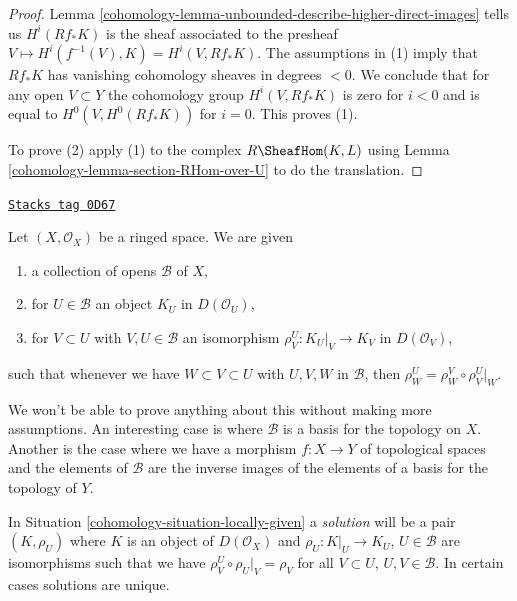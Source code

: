 \begin{proof}

Lemma \ref{cohomology-lemma-unbounded-describe-higher-direct-images} tells us
$H^i(Rf_*K)$ is the sheaf associated to the presheaf
$V \mapsto H^i(f^{-1}(V), K) = H^i(V, Rf_*K)$.
The assumptions in (1) imply that $Rf_*K$ has vanishing cohomology
sheaves in degrees $< 0$. We conclude that for any open $V \subset Y$
the cohomology group $H^i(V, Rf_*K)$ is zero for $i < 0$ and is equal to
$H^0(V, H^0(Rf_*K))$ for $i = 0$. This proves (1).

\medskip\noindent
To prove (2) apply (1) to the complex $R\SheafHom(K, L)$ using
Lemma \ref{cohomology-lemma-section-RHom-over-U} to do the translation.
\end{proof}

\begin{definition}
\label{cohomology-situation-locally-given}
\href{https://stacks.math.columbia.edu/tag/0D67}{\texttt{Stacks tag 0D67}}

Let $(X, \mathcal{O}_X)$ be a ringed space. We are given
\begin{enumerate}
\item a collection of opens $\mathcal{B}$ of $X$,
\item for $U \in \mathcal{B}$ an object $K_U$ in $D(\mathcal{O}_U)$,
\item for $V \subset U$ with $V, U \in \mathcal{B}$ an isomorphism
$\rho^U_V : K_U|_V \to K_V$ in $D(\mathcal{O}_V)$,
\end{enumerate}
such that whenever we have $W \subset V \subset U$ with $U, V, W$ in
$\mathcal{B}$, then $\rho^U_W = \rho^V_W \circ \rho ^U_V|_W$.
\end{definition}

We won't be able to prove anything about this without making more
assumptions. An interesting case is where $\mathcal{B}$ is a basis
for the topology on $X$. Another is the case where we have a morphism
$f : X \to Y$ of topological spaces and the elements of $\mathcal{B}$
are the inverse images of the elements of a basis for the topology of $Y$.

\medskip\noindent
In Situation \ref{cohomology-situation-locally-given} a {\it solution}
will be a pair $(K, \rho_U)$ where $K$ is an object of $D(\mathcal{O}_X)$
and $\rho_U : K|_U \to K_U$, $U \in \mathcal{B}$
are isomorphisms such that
we have $\rho^U_V \circ \rho_U|_V = \rho_V$ for all $V \subset U$,
$U, V \in \mathcal{B}$. In certain cases solutions are unique.

